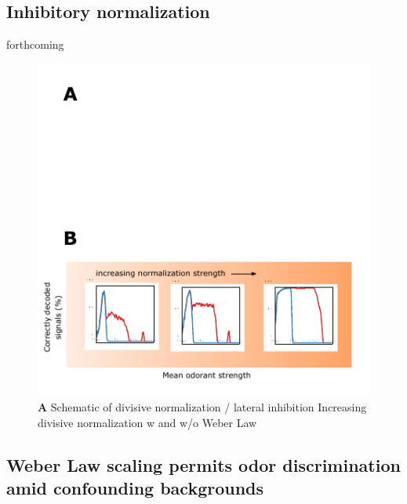 \subsection{Inhibitory normalization}

{\color{blue} forthcoming}





\begin{figure}
	\includegraphics[width=\textwidth]{figures/Figures_signal_decoding_weber_law_2}
	\caption{\textbf{A} Schematic of divisive normalization / lateral inhibition  Increasing divisive normalization w and w/o Weber Law}
	\label{fig:divisive_normalization}
\end{figure}






\subsection{Weber Law scaling permits odor discrimination amid confounding backgrounds}


